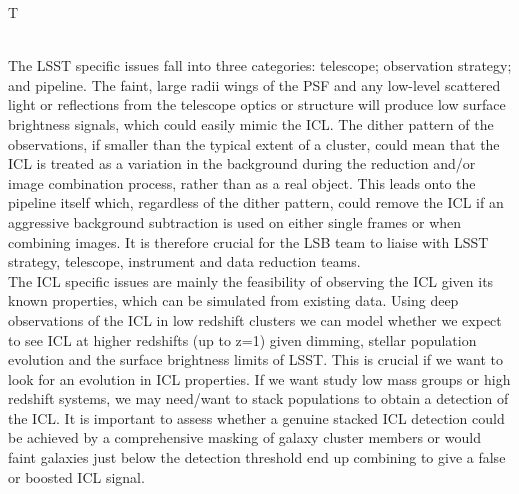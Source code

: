 \begin{tasklist}{T}
\begin{task}
{\\
The LSST specific issues fall into three categories: telescope; observation strategy; and pipeline. The faint, large radii wings of the PSF and any low-level scattered light or reflections from the telescope optics or structure will produce low surface brightness signals, which could easily mimic the ICL. The dither pattern of the observations, if smaller than the typical extent of a cluster, could mean that the ICL is treated as a variation in the background during the reduction and/or image combination process, rather than as a real object. This leads onto the pipeline itself which, regardless of the dither pattern, could remove the ICL if an aggressive background subtraction is used on either single frames or when combining images. It is therefore crucial for the LSB team to liaise with LSST strategy, telescope, instrument and data reduction teams.
\\
The ICL specific issues are mainly the feasibility of observing the ICL given its known properties, which can be simulated from existing data. Using deep observations of the ICL in low redshift clusters we can model whether we expect to see ICL at higher redshifts (up to z=1) given dimming, stellar population evolution and the surface brightness limits of LSST. This is crucial if we want to look for an evolution in ICL properties. If we want study low mass groups or high redshift systems, we may need/want to stack populations to obtain a detection of the ICL. It is important to assess whether a genuine stacked ICL detection could be achieved by a comprehensive masking of galaxy cluster members or would faint galaxies just below the detection threshold end up combining to give a false or boosted ICL signal.
}
\end{task}
\end{tasklist}